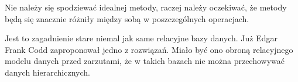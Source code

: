 Nie należy się spodziewać idealnej metody, raczej należy oczekiwać, że metody będą się znacznie różniły między sobą w poszczególnych operacjach.


Jest to zagadnienie stare niemal jak same relacyjne bazy danych. 
Już Edgar Frank Codd zaproponował jedno z rozwiązań.
Miało być ono obroną relacyjnego modelu danych przed zarzutami, 
że w takich bazach nie można przechowywać danych hierarchicznych.



